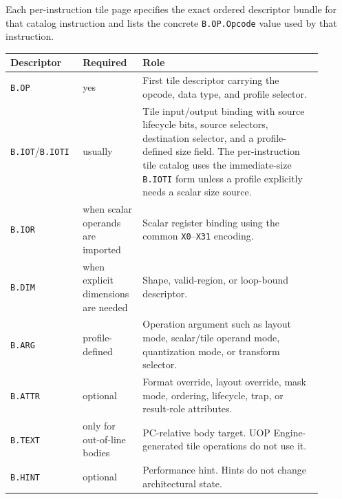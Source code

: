 Each per-instruction tile page specifies the exact ordered descriptor bundle for that catalog instruction and lists the concrete \texttt{B.OP.Opcode} value used by that instruction.

\begin{longtable}{@{}L{0.18\linewidth}L{0.18\linewidth}L{0.54\linewidth}@{}}
\toprule
Descriptor & Required & Role \\
\midrule
\texttt{B.OP} & yes & First tile descriptor carrying the opcode, data type, and profile selector. \\
\texttt{B.IOT}/\texttt{B.IOTI} & usually & Tile input/output binding with source lifecycle bits, source selectors, destination selector, and a profile-defined size field. The per-instruction tile catalog uses the immediate-size \texttt{B.IOTI} form unless a profile explicitly needs a scalar size source. \\
\texttt{B.IOR} & when scalar operands are imported & Scalar register binding using the common \texttt{X0}--\texttt{X31} encoding. \\
\texttt{B.DIM} & when explicit dimensions are needed & Shape, valid-region, or loop-bound descriptor. \\
\texttt{B.ARG} & profile-defined & Operation argument such as layout mode, scalar/tile operand mode, quantization mode, or transform selector. \\
\texttt{B.ATTR} & optional & Format override, layout override, mask mode, ordering, lifecycle, trap, or result-role attributes. \\
\texttt{B.TEXT} & only for out-of-line bodies & PC-relative body target. UOP Engine-generated tile operations do not use it. \\
\texttt{B.HINT} & optional & Performance hint. Hints do not change architectural state. \\
\bottomrule
\end{longtable}

